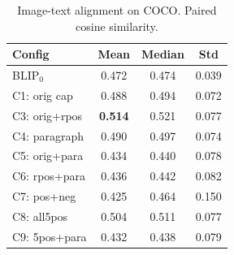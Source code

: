 \begin{table}[t]
\centering
\caption{Image-text alignment on COCO. Paired cosine similarity.}
\label{tab:align_coco}
\small
\begin{tabular}{lccc}
\toprule
\textbf{Config} & \textbf{Mean} & \textbf{Median} & \textbf{Std} \\
\midrule
BLIP$_0$ & 0.472 & 0.474 & 0.039 \\
\midrule
C1: orig cap & 0.488 & 0.494 & 0.072 \\
C3: orig+rpos & \textbf{0.514} & 0.521 & 0.077 \\
C4: paragraph & 0.490 & 0.497 & 0.074 \\
C5: orig+para & 0.434 & 0.440 & 0.078 \\
C6: rpos+para & 0.436 & 0.442 & 0.082 \\
C7: pos+neg & 0.425 & 0.464 & 0.150 \\
C8: all5pos & 0.504 & 0.511 & 0.077 \\
C9: 5pos+para & 0.432 & 0.438 & 0.079 \\
\bottomrule
\end{tabular}
\end{table}
